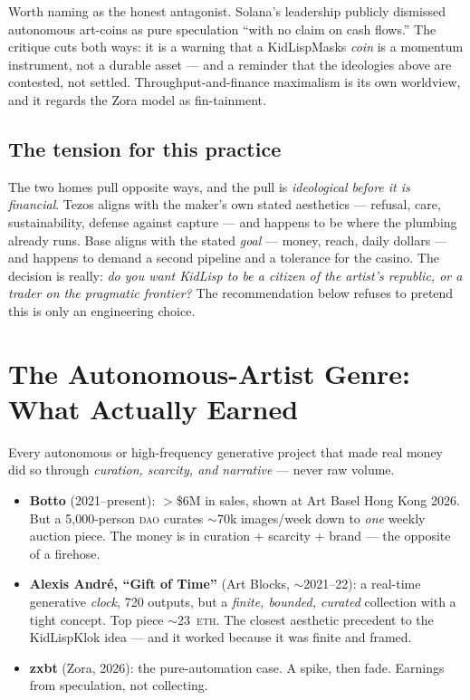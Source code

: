 \documentclass[10pt,letterpaper,twocolumn]{article}
\begin{document}
Worth naming as the honest antagonist. Solana's leadership publicly dismissed autonomous art-coins as pure speculation ``with no claim on cash flows.'' The critique cuts both ways: it is a warning that a KidLispMasks \emph{coin} is a momentum instrument, not a durable asset --- and a reminder that the ideologies above are contested, not settled. Throughput-and-finance maximalism is its own worldview, and it regards the Zora model as fin-tainment.

\subsection{The tension for this practice}

The two homes pull opposite ways, and the pull is \emph{ideological before it is financial}. Tezos aligns with the maker's own stated aesthetics --- refusal, care, sustainability, defense against capture --- and happens to be where the plumbing already runs. Base aligns with the stated \emph{goal} --- money, reach, daily dollars --- and happens to demand a second pipeline and a tolerance for the casino. The decision is really: \emph{do you want KidLisp to be a citizen of the artist's republic, or a trader on the pragmatic frontier?} The recommendation below refuses to pretend this is only an engineering choice.

\section{The Autonomous-Artist Genre: What Actually Earned}

Every autonomous or high-frequency generative project that made real money did so through \emph{curation, scarcity, and narrative} --- never raw volume.

\begin{itemize}
  \item \textbf{Botto} (2021--present): $>$\$6M in sales, shown at Art Basel Hong Kong 2026. But a 5{,}000-person \textsc{dao} curates $\sim$70k images/week down to \emph{one} weekly auction piece. The money is in curation + scarcity + brand --- the opposite of a firehose.
  \item \textbf{Alexis Andr\'e, ``Gift of Time''} (Art Blocks, $\sim$2021--22): a real-time generative \emph{clock}, 720 outputs, but a \emph{finite, bounded, curated} collection with a tight concept. Top piece $\sim$23~\textsc{eth}. The closest aesthetic precedent to the KidLispKlok idea --- and it worked because it was finite and framed.
  \item \textbf{zxbt} (Zora, 2026): the pure-automation case. A spike, then fade. Earnings from speculation, not collecting.
\end{itemize}
\end{document}

